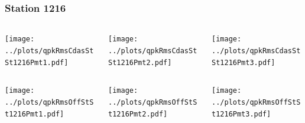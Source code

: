 \documentclass[aspectratio=169]{beamer}
\begin{document}
\begin{frame} 
  \frametitle{Station 1216}
  \begin{center}
    \begin{columns}
      \begin{column}{0.33\textwidth}
        \texttt{[image: ../plots/qpkRmsCdasStSt1216Pmt1.pdf]}
      \end{column}
      \begin{column}{0.33\textwidth}
        \texttt{[image: ../plots/qpkRmsCdasStSt1216Pmt2.pdf]}
      \end{column}
      \begin{column}{0.33\textwidth}
        \texttt{[image: ../plots/qpkRmsCdasStSt1216Pmt3.pdf]}
      \end{column}
    \end{columns}
  \end{center}

  \begin{center}
    \begin{columns}
      \begin{column}{0.33\textwidth}
        \texttt{[image: ../plots/qpkRmsOffStSt1216Pmt1.pdf]}
      \end{column}
      \begin{column}{0.33\textwidth}
        \texttt{[image: ../plots/qpkRmsOffStSt1216Pmt2.pdf]}
      \end{column}
      \begin{column}{0.33\textwidth}
        \texttt{[image: ../plots/qpkRmsOffStSt1216Pmt3.pdf]}
      \end{column}
    \end{columns}
  \end{center}
\end{frame}
\end{document}
